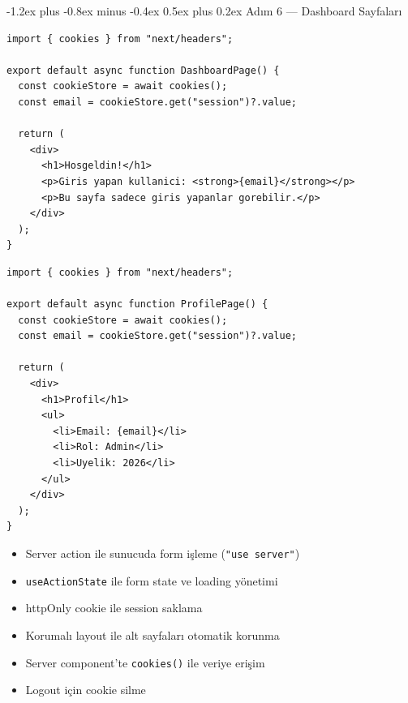 \documentclass[12pt, a4paper]{article}
\makeatletter
\renewcommand{\subsection}{%
  \@startsection{subsection}{2}{\z@}%
    {-1.2ex plus -0.8ex minus -0.4ex}%
    {0.5ex plus 0.2ex}%
    {\normalfont\large\bfseries\sffamily\color{secondary}}%
}
\makeatother
\begin{document}
\newpage
\subsection{Adım 6 --- Dashboard Sayfaları}

\begin{tcolorbox}[enhanced, colback=codebg, colframe=gray!30,
    colbacktitle=primary!85!black, coltitle=white, arc=4pt,
    title={\sffamily\bfseries\small src/app/dashboard/page.tsx}]
\begin{lstlisting}[style=jsxstyle]
import { cookies } from "next/headers";

export default async function DashboardPage() {
  const cookieStore = await cookies();
  const email = cookieStore.get("session")?.value;

  return (
    <div>
      <h1>Hosgeldin!</h1>
      <p>Giris yapan kullanici: <strong>{email}</strong></p>
      <p>Bu sayfa sadece giris yapanlar gorebilir.</p>
    </div>
  );
}
\end{lstlisting}
\end{tcolorbox}

\vspace{4pt}

\begin{tcolorbox}[enhanced, colback=codebg, colframe=gray!30,
    colbacktitle=primary!85!black, coltitle=white, arc=4pt,
    title={\sffamily\bfseries\small src/app/dashboard/profile/page.tsx}]
\begin{lstlisting}[style=jsxstyle]
import { cookies } from "next/headers";

export default async function ProfilePage() {
  const cookieStore = await cookies();
  const email = cookieStore.get("session")?.value;

  return (
    <div>
      <h1>Profil</h1>
      <ul>
        <li>Email: {email}</li>
        <li>Rol: Admin</li>
        <li>Uyelik: 2026</li>
      </ul>
    </div>
  );
}
\end{lstlisting}
\end{tcolorbox}

\vspace{6pt}

\begin{infobox}
\begin{itemize}
  \item Server action ile sunucuda form işleme (\texttt{"use server"})
  \item \texttt{useActionState} ile form state ve loading yönetimi
  \item httpOnly cookie ile session saklama
  \item Korumalı layout ile alt sayfaları otomatik korunma
  \item Server component'te \texttt{cookies()} ile veriye erişim
  \item Logout için cookie silme
\end{itemize}
\end{infobox}
\end{document}
